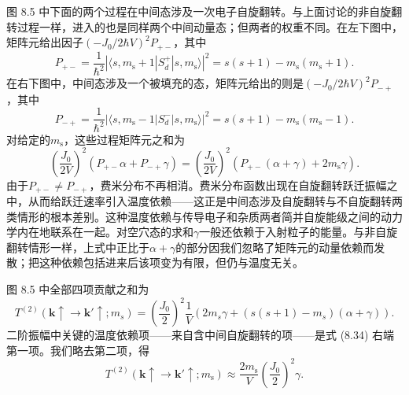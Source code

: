 图 8.5 中下面的两个过程在中间态涉及一次电子自旋翻转。与上面讨论的非自旋翻转过程一样，进入的也是同样两个中间动量态；但两者的权重不同。在左下图中，矩阵元给出因子$(-J_0/2\hbar V)^2P_{+-}$，其中
\begin{equation*}
P_{+-} = \frac{1}{\hbar^2}\left|\langle s,m_{\mathrm{s}}+1|S_d^{+}|s,m_{\mathrm{s}}\rangle\right|^2 = s(s+1)-m_{\mathrm{s}}(m_{\mathrm{s}}+1).
\tag{8.31}
\end{equation*}
在右下图中，中间态涉及一个被填充的态，矩阵元给出的则是$(-J_0/2\hbar V)^2P_{-+}$，其中
\begin{equation*}
P_{-+} = \frac{1}{\hbar^2}\left|\langle s,m_{\mathrm{s}}-1|S_d^{-}|s,m_{\mathrm{s}}\rangle\right|^2 = s(s+1)-m_{\mathrm{s}}(m_{\mathrm{s}}-1).
\tag{8.32}
\end{equation*}
对给定的$m_{\mathrm{s}}$，这些过程矩阵元之和为
\begin{equation*}
\left(\frac{J_0}{2V}\right)^2(P_{+-}\alpha+P_{-+}\gamma) = \left(\frac{J_0}{2V}\right)^2\left(P_{+-}(\alpha+\gamma)+2m_{\mathrm{s}}\gamma\right).
\tag{8.33}
\end{equation*}
由于$P_{+-}\neq P_{-+}$，费米分布不再相消。费米分布函数出现在自旋翻转跃迁振幅之中，从而给跃迁速率引入温度依赖——这正是中间态涉及自旋翻转与不自旋翻转两类情形的根本差别。这种温度依赖与传导电子和杂质两者简并自旋能级之间的动力学内在地联系在一起。对空穴态的求和$\gamma$一般还依赖于入射粒子的能量。与非自旋翻转情形一样，上式中正比于$\alpha+\gamma$的部分因我们忽略了矩阵元的动量依赖而发散；把这种依赖包括进来后该项变为有限，但仍与温度无关。

图 8.5 中全部四项贡献之和为
\begin{equation*}
T^{(2)}(\mathbf{k}\uparrow\to\mathbf{k}'\uparrow;m_s) = \left(\frac{J_0}{2}\right)^2\frac{1}{V}\left(2m_s\gamma+(s(s+1)-m_s)(\alpha+\gamma)\right).
\tag{8.34}
\end{equation*}
二阶振幅中关键的温度依赖项——来自含中间自旋翻转的项——是式 (8.34) 右端第一项。我们略去第二项，得
\begin{equation*}
T^{(2)}(\mathbf{k}\uparrow\to\mathbf{k}'\uparrow;m_{\mathrm{s}}) \approx \frac{2m_{\mathrm{s}}}{V}\left(\frac{J_0}{2}\right)^2\gamma.
\tag{8.35}
\end{equation*}

